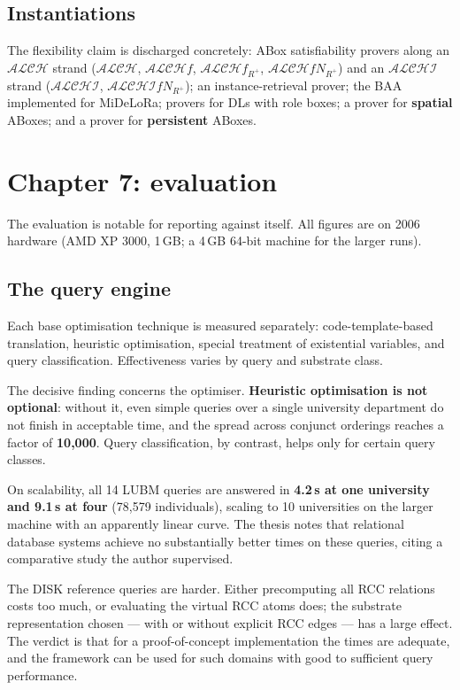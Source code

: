 \documentclass[11pt,a4paper,DIV=12,parskip=half]{scrartcl}
\begin{document}
\subsection{Instantiations}

The flexibility claim is discharged concretely: ABox satisfiability provers along
an $\mathcal{ALCH}$ strand ($\mathcal{ALCH}$, $\mathcal{ALCH}f$,
$\mathcal{ALCH}f_{R^+}$, $\mathcal{ALCH}fN_{R^+}$) and an $\mathcal{ALCHI}$
strand ($\mathcal{ALCHI}$, $\mathcal{ALCHI}fN_{R^+}$); an instance-retrieval
prover; the BAA implemented for MiDeLoRa; provers for DLs with role boxes; a
prover for \textbf{spatial} ABoxes; and a prover for \textbf{persistent} ABoxes.

\section{Chapter 7: evaluation}

The evaluation is notable for reporting against itself. All figures are on 2006
hardware (AMD XP 3000, 1\,GB; a 4\,GB 64-bit machine for the larger runs).

\subsection{The query engine}

Each base optimisation technique is measured separately: code-template-based
translation, heuristic optimisation, special treatment of existential variables,
and query classification. Effectiveness varies by query and substrate class.

The decisive finding concerns the optimiser. \textbf{Heuristic optimisation is
not optional}: without it, even simple queries over a single university
department do not finish in acceptable time, and the spread across conjunct
orderings reaches a factor of \textbf{10,000}. Query classification, by contrast,
helps only for certain query classes.

On scalability, all 14 LUBM queries are answered in \textbf{4.2\,s at one
university and 9.1\,s at four} (78,579 individuals), scaling to 10 universities
on the larger machine with an apparently linear curve. The thesis notes that
relational database systems achieve no substantially better times on these
queries, citing a comparative study the author supervised.

The DISK reference queries are harder. Either precomputing all RCC relations
costs too much, or evaluating the virtual RCC atoms does; the substrate
representation chosen --- with or without explicit RCC edges --- has a large
effect. The verdict is that for a proof-of-concept implementation the times are
adequate, and the framework can be used for such domains with good to sufficient
query performance.
\end{document}
